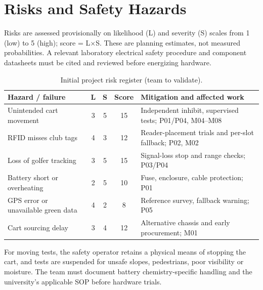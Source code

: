 \section{Risks and Safety Hazards}
Risks are assessed provisionally on likelihood (L) and severity (S) scales from 1 (low) to 5 (high); score = L$\times$S. These are planning estimates, not measured probabilities. A relevant laboratory electrical safety procedure and component datasheets must be cited and reviewed before energizing hardware.
\begin{table}[ht]\centering\scriptsize\caption{Initial project risk register (team to validate).}\begin{tabularx}{\linewidth}{X c c c X}\toprule Hazard / failure & L & S & Score & Mitigation and affected work\\\midrule
Unintended cart movement & 3&5&15 & Independent inhibit, supervised tests; P01/P04, M04--M08\\
RFID misses club tags & 4&3&12 & Reader-placement trials and per-slot fallback; P02, M02\\
Loss of golfer tracking & 3&5&15 & Signal-loss stop and range checks; P03/P04\\
Battery short or overheating & 2&5&10 & Fuse, enclosure, cable protection; P01\\
GPS error or unavailable green data & 4&2&8 & Reference survey, fallback warning; P05\\
Cart sourcing delay & 3&4&12 & Alternative chassis and early procurement; M01\\
\bottomrule\end{tabularx}\end{table}
For moving tests, the safety operator retains a physical means of stopping the cart, and tests are suspended for unsafe slopes, pedestrians, poor visibility or moisture. The team must document battery chemistry-specific handling and the university's applicable SOP before hardware trials.\par
